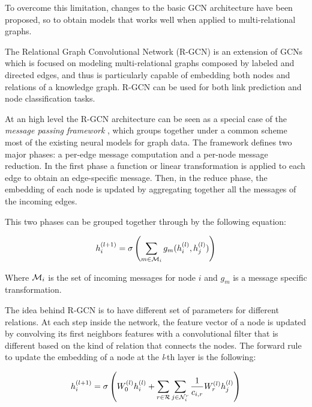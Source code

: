 \documentclass[%
    corpo=13.5pt,
    twoside,
    oldstyle,
    tipotesi=magistrale,
    greek,
    evenboxes
]{toptesi}
\begin{document}
To overcome this limitation, changes to the basic GCN architecture have been
proposed, so to obtain models that works well when applied to multi-relational
graphs.
\newline

The Relational Graph Convolutional Network \cite{schlichtkrull2018} (R-GCN) is an
extension of GCNs which is focused on modeling multi-relational graphs composed
by labeled and directed edges, and thus is particularly capable of embedding
both nodes and relations of a knowledge graph.
R-GCN can be used for both link prediction and node classification tasks.

At an high level the R-GCN architecture can be seen as a special case of
the \emph{message passing framework} \cite{gilmer2017}, which groups together
under a common scheme most of the existing neural models for graph data.
The framework defines two major phases: a per-edge message computation and a
per-node message reduction.
In the first phase a function or linear transformation is applied to each edge
to obtain an edge-specific message.
Then, in the reduce phase, the embedding of each node is updated by aggregating
together all the messages of the incoming edges.

This two phases can be grouped together through by the following equation:

\begin{equation}
    h_i^{(l+1)} = \sigma \left(
            \sum_{m\in{\CMcal{M}_i}} g_m(h_i^{(l)}, h_j^{(l)})
        \right)
\end{equation}

Where $\CMcal{M}_i$ is the set of incoming messages for node $i$ and
$g_m$ is a message specific transformation.
\newline

The idea behind R-GCN is to have different set of parameters
for different relations.
At each step inside the network, the feature vector of a node is updated by
convolving its first neighbors features with a convolutional filter that is
different based on the kind of relation that connects the nodes.
The forward
rule to update the embedding of a node at the \emph{l}-th layer is the following:

\begin{equation}
    h^{(l+1)}_{i} = \sigma \left(
        W_0^{(l)}h_i^{(l)} + \sum_{r\in\CMcal{R}}\sum_{j\in\CMcal{N}_i^r}
        \frac{1}{c_{i,r}} W_r^{(l)} h_j^{(l)}
    \right)
\end{equation}
\end{document}
